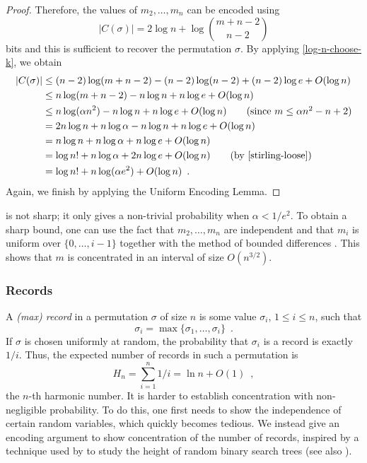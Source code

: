 \documentclass[format=acmsmall, review=false, screen=true]{acmart}
\begin{document}
\begin{proof}
  Therefore, the values of $m_2,\ldots,m_n$ can be encoded using
  \[
    |C(\sigma)| = 2\log n + \log\binom{m+n-2}{n-2}
  \]
  bits and this is sufficient to recover the permutation $\sigma$.  By
  applying \eqref{log-n-choose-k}, we obtain
  \begin{align*}
    |C(\sigma)| & \le (n-2)\log(m+n-2) - (n-2)\log(n-2)  + (n-2)\log e + O(\log n) \\
      & \le n\log(m+n-2) - n\log n   + n\log e + O(\log n) \\
      & \le n\log(\alpha n^2) - n\log n  + n\log e + O(\log n) \tag{since $m \le \alpha n^2 - n + 2$}\\
      & = 2n\log n + n\log\alpha - n\log n  + n\log e + O(\log n) \\
      & = n\log n + n\log\alpha + n\log e + O(\log n) \\
      & = \log n! + n\log\alpha + 2n\log e + O(\log n) \tag{by \eqref{stirling-loose}} \\
      & = \log n! + n \log (\alpha e^2) + O(\log n) \enspace .
  \end{align*}
  Again, we finish by applying the Uniform Encoding Lemma.
\end{proof}


\begin{rem}
   is not sharp; it only gives a non-trivial
  probability when $\alpha < 1/e^2$.  To obtain a sharp bound, one can
  use the fact that $m_2,\ldots,m_n$ are independent and that $m_i$ is
  uniform over $\{0,\ldots,i-1\}$ together with the method of bounded
  differences \cite{mcdiarmid:on}. This shows that $m$ is concentrated in
  an interval of size $O(n^{3/2})$.
\end{rem}

\subsubsection{Records}

A \emph{(max) record} in a permutation $\sigma$ of size
$n$ is some value $\sigma_i$, $1 \leq i \leq n$, such that
\[
  \sigma_i = \max\{\sigma_1, \dots, \sigma_i\} \enspace .
\]
If $\sigma$ is chosen uniformly at random, the probability that 
$\sigma_i$ is a record is exactly $1/i$. Thus, 
the expected number of records in such a permutation is
\[
  H_n = \sum_{i = 1}^n 1/i = \ln n + O(1) \enspace ,
\]
the $n$-th harmonic number. It is harder to establish concentration
with non-negligible probability. To do this, one first needs to show
the independence of certain random variables, which quickly becomes
tedious. We instead give an encoding argument to show concentration of
the number of records, inspired by a technique used by 
 to study the height of random binary search trees
 (see also ).
\end{document}
